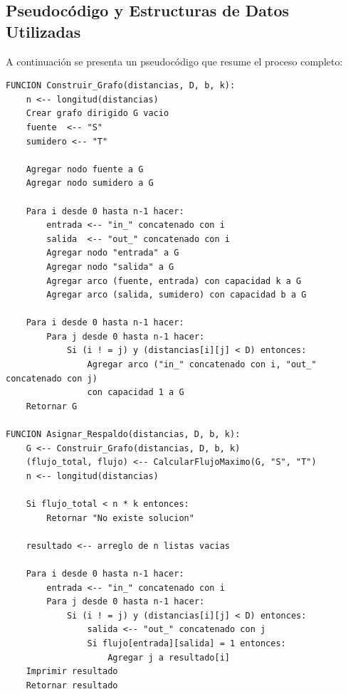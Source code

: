 \documentclass[a4paper, 12pt]{article}
\begin{document}
\subsection{Pseudocódigo y Estructuras de Datos Utilizadas}
A continuación se presenta un pseudocódigo que resume el proceso completo:


\begin{lstlisting}[frame=single, caption={Pseudocódigo para construir el grafo y asignar respaldo}]
FUNCION Construir_Grafo(distancias, D, b, k):
    n <-- longitud(distancias)
    Crear grafo dirigido G vacio
    fuente  <-- "S"
    sumidero <-- "T"
    
    Agregar nodo fuente a G
    Agregar nodo sumidero a G
    
    Para i desde 0 hasta n-1 hacer:
        entrada <-- "in_" concatenado con i
        salida  <-- "out_" concatenado con i
        Agregar nodo "entrada" a G
        Agregar nodo "salida" a G
        Agregar arco (fuente, entrada) con capacidad k a G
        Agregar arco (salida, sumidero) con capacidad b a G
    
    Para i desde 0 hasta n-1 hacer:
        Para j desde 0 hasta n-1 hacer:
            Si (i ! = j) y (distancias[i][j] < D) entonces:
                Agregar arco ("in_" concatenado con i, "out_" concatenado con j)
                con capacidad 1 a G  
    Retornar G

FUNCION Asignar_Respaldo(distancias, D, b, k):
    G <-- Construir_Grafo(distancias, D, b, k)
    (flujo_total, flujo) <-- CalcularFlujoMaximo(G, "S", "T")
    n <-- longitud(distancias)
    
    Si flujo_total < n * k entonces:
        Retornar "No existe solucion"
    
    resultado <-- arreglo de n listas vacias
    
    Para i desde 0 hasta n-1 hacer:
        entrada <-- "in_" concatenado con i
        Para j desde 0 hasta n-1 hacer:
            Si (i ! = j) y (distancias[i][j] < D) entonces:
                salida <-- "out_" concatenado con j
                Si flujo[entrada][salida] = 1 entonces:
                    Agregar j a resultado[i]
    Imprimir resultado
    Retornar resultado
\end{lstlisting}
\end{document}
